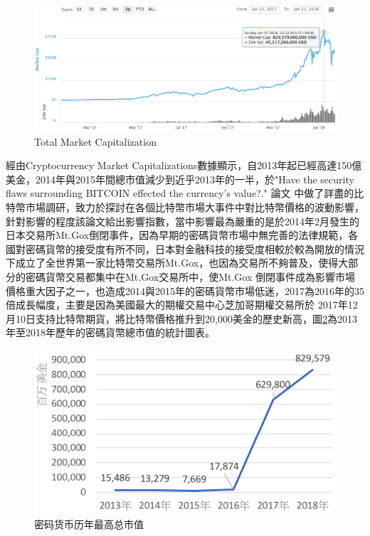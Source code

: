 	\begin{figure}[h]
		\centering
		\includegraphics[width = .9\textwidth]{TotalMarketCapitalization.png}
		\caption{Total Market Capitalization\supercite{CryptocurrencyMarketCapitalizations}}\label{TotalMarketCapitalization}
	\end{figure}

	經由Cryptocurrency Market Capitalizations數據顯示，自2013年起已經高達150億美金，2014年與2015年間總市值減少到近乎2013年的一半，於"Have the security flaws surrounding BITCOIN effected the currency's value?."
	論文\supercite{HavethesecurityflawssurroundingBITCOINeffectedthecurrencysvalue?}
	中做了詳盡的比特幣市場調研，致力於探討在各個比特幣市場大事件中對比特幣價格的波動影響，針對影響的程度該論文給出影響指數，當中影響最為嚴重的是於2014年2月發生的日本交易所Mt.Gox倒閉事件，因為早期的密碼貨幣市場中無完善的法律規範，各國對密碼貨幣的接受度有所不同，日本對金融科技的接受度相較於較為開放的情況下成立了全世界第一家比特幣交易所Mt.Gox，也因為交易所不夠普及，使得大部分的密碼貨幣交易都集中在Mt.Gox交易所中，使Mt.Gox 倒閉事件成為影響市場價格重⼤因⼦之⼀，也造成2014與2015年的密碼貨幣市場低迷，2017為2016年的35倍成長幅度，主要是因為美國最大的期權交易中心芝加哥期權交易所於	2017年12月10日支持比特幣期貨，將比特幣價格推升到20,000美金的歷史新高，圖\ref{Thetotalmarketcapitalization}為2013年至2018年歷年的密碼貨幣總市值的統計圖表。

		\begin{figure}[h]
			\centering
			\includegraphics[width = .7\textwidth]{Thetotalmarketcapitalization.png}
			\caption{密码货币历年最高总市值\supercite{CryptocurrencyMarketCapitalizations}}\label{Thetotalmarketcapitalization}
		\end{figure}
	

